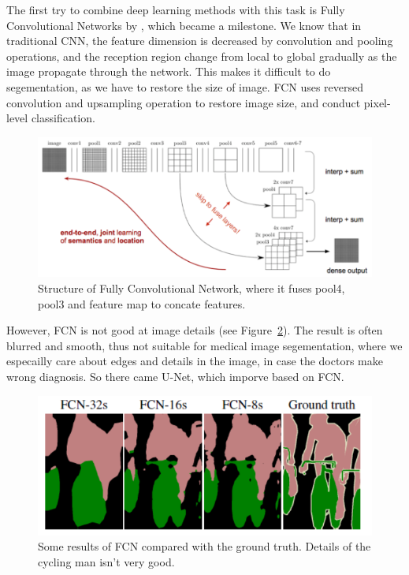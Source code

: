 The first try to combine deep learning methods with this task is Fully Convolutional Networks by \cite{FCN}, which became a milestone. We know that in traditional CNN, the feature dimension is decreased by convolution and pooling operations, and the reception region change from local to global gradually as the image propagate through the network. This makes it difficult to do segementation, as we have to restore the size of image. FCN uses reversed convolution and upsampling operation to restore image size, and conduct pixel-level classification.
\begin{figure}[!htpb]
    \centering
    \includegraphics[scale=0.3]{figuras/FCN.PNG}
    \caption{Structure of Fully Convolutional Network, where it fuses pool4, pool3 and feature map to concate features.}
    \label{fig:fcn}
\end{figure}

However, FCN is not good at image details (see Figure~\ref{fig:fcnd}). The result is often blurred and smooth, thus not suitable for medical image segementation, where we especailly care about edges and details in the image, in case the doctors make wrong diagnosis. So there came U-Net, which imporve based on FCN. 

\begin{figure}[!htpb]
    \centering
    \includegraphics[scale=0.5]{figuras/FCNdetail.PNG}
    \caption{Some results of FCN compared with the ground truth. Details of the cycling man isn't very good.}
    \label{fig:fcnd}
\end{figure}


